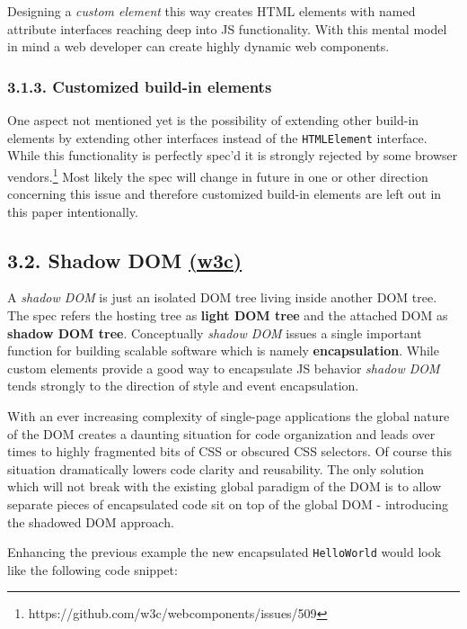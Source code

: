 \documentclass[]{article}
\begin{document}
Designing a \emph{custom element} this way creates HTML elements with
named attribute interfaces reaching deep into JS functionality. With
this mental model in mind a web developer can create highly dynamic web
components.

\subsubsection{3.1.3. Customized build-in
elements}\label{customized-build-in-elements}

One aspect not mentioned yet is the possibility of extending other
build-in elements by extending other interfaces instead of the
\texttt{HTMLElement} interface. While this functionality is perfectly
spec'd it is strongly rejected by some browser vendors.\footnote{https://github.com/w3c/webcomponents/issues/509}
Most likely the spec will change in future in one or other direction
concerning this issue and therefore customized build-in elements are
left out in this paper intentionally.

\subsection{\texorpdfstring{3.2. Shadow DOM
\href{http://w3c.github.io/webcomponents/spec/shadow/}{(w3c)}}{3.2. Shadow DOM (w3c)}}\label{shadow-dom-w3c}

A \emph{shadow DOM} is just an isolated DOM tree living inside another
DOM tree. The spec refers the hosting tree as \textbf{light DOM tree}
and the attached DOM as \textbf{shadow DOM tree}. Conceptually
\emph{shadow DOM} issues a single important function for building
scalable software which is namely \textbf{encapsulation}. While custom
elements provide a good way to encapsulate JS behavior \emph{shadow DOM}
tends strongly to the direction of style and event encapsulation.

With an ever increasing complexity of single-page applications the
global nature of the DOM creates a daunting situation for code
organization and leads over times to highly fragmented bits of CSS or
obscured CSS selectors. Of course this situation dramatically lowers
code clarity and reusability. The only solution which will not break
with the existing global paradigm of the DOM is to allow separate pieces
of encapsulated code sit on top of the global DOM - introducing the
shadowed DOM approach.

Enhancing the previous example the new encapsulated \texttt{HelloWorld}
would look like the following code snippet:
\end{document}
